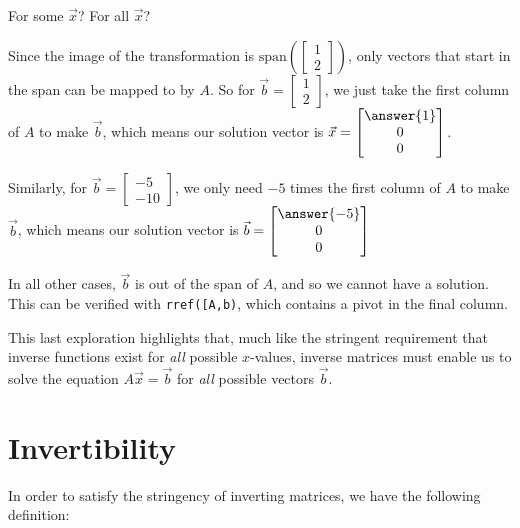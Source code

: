 \documentclass{ximera}
\begin{document}
\begin{exploration}{For some $\vec{x}$? For all $\vec{x}$?}
\begin{selectAll}
  \end{selectAll}

  \begin{feedback}
  
    Since the image of the transformation is $\mbox{span}\left(\begin{bmatrix}1\\2\end{bmatrix}\right)$, only vectors that start in the span can be mapped to by $A$. So for $\vec{b}=\begin{bmatrix}
    1\\2
    \end{bmatrix}$, we just take the first column of $A$ to make $\vec{b}$, which means our solution vector is $\vec{x}=\begin{bmatrix}
      \answer{1}\\0\\0
    \end{bmatrix}$. 

    Similarly, for $\vec{b}=\begin{bmatrix}
      -5\\-10
    \end{bmatrix}$, we only need $-5$ times the first column of $A$ to make $\vec{b}$, which means our solution vector is $\vec{b}=\begin{bmatrix}
      \answer{-5}\\0\\0
    \end{bmatrix}$

    In all other cases, $\vec{b}$ is out of the span of $A$, and so we cannot have a solution. This can be verified with \texttt{rref([A,b)}, which contains a pivot in the final column.

  \end{feedback}

\end{exploration}

This last exploration highlights that, much like the stringent requirement that inverse functions exist for \emph{all} possible $x$-values, inverse matrices must enable us to solve the equation $A\vec{x}=\vec{b}$ for \emph{all} possible vectors $\vec{b}$.

\section*{Invertibility}

In order to satisfy the stringency of inverting matrices, we have the following definition:
\end{document}
